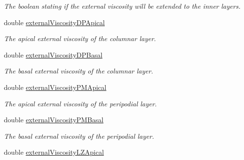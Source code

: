 \begin{DoxyCompactItemize}
\begin{DoxyCompactList}\small\item\em The boolean stating if the external viscosity will be extended to the inner layers. \end{DoxyCompactList}\item 
\hypertarget{classSimulation_ae0960e3fb2edb70918f75e27826d3bad}{}double \hyperlink{classSimulation_ae0960e3fb2edb70918f75e27826d3bad}{external\+Viscosity\+D\+P\+Apical}\label{classSimulation_ae0960e3fb2edb70918f75e27826d3bad}

\begin{DoxyCompactList}\small\item\em The apical external viscosity of the columnar layer. \end{DoxyCompactList}\item 
\hypertarget{classSimulation_a2cb640995a5288502bd0ba3ea6a6c893}{}double \hyperlink{classSimulation_a2cb640995a5288502bd0ba3ea6a6c893}{external\+Viscosity\+D\+P\+Basal}\label{classSimulation_a2cb640995a5288502bd0ba3ea6a6c893}

\begin{DoxyCompactList}\small\item\em The basal external viscosity of the columnar layer. \end{DoxyCompactList}\item 
\hypertarget{classSimulation_aa794b85325ceb5339a21c3166cc40313}{}double \hyperlink{classSimulation_aa794b85325ceb5339a21c3166cc40313}{external\+Viscosity\+P\+M\+Apical}\label{classSimulation_aa794b85325ceb5339a21c3166cc40313}

\begin{DoxyCompactList}\small\item\em The apical external viscosity of the peripodial layer. \end{DoxyCompactList}\item 
\hypertarget{classSimulation_acdd300d98cfaa633b13e2d091aa17398}{}double \hyperlink{classSimulation_acdd300d98cfaa633b13e2d091aa17398}{external\+Viscosity\+P\+M\+Basal}\label{classSimulation_acdd300d98cfaa633b13e2d091aa17398}

\begin{DoxyCompactList}\small\item\em The basal external viscosity of the peripodial layer. \end{DoxyCompactList}\item 
\hypertarget{classSimulation_a7008c3c2a7451471a70bdffb4e97054e}{}double \hyperlink{classSimulation_a7008c3c2a7451471a70bdffb4e97054e}{external\+Viscosity\+L\+Z\+Apical}\label{classSimulation_a7008c3c2a7451471a70bdffb4e97054e}


\end{DoxyCompactItemize}
